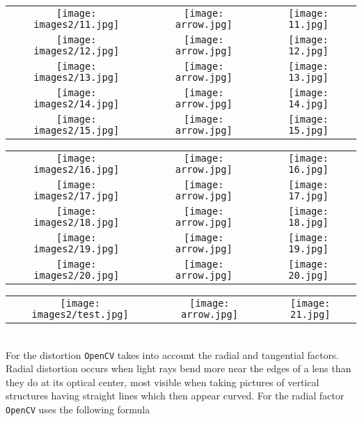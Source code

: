 \documentclass[12pt, a4paper]{article}
\begin{document}
\begin{enumerate}
\hspace*{-1cm}
\begin{tabular}[t]{ccc}
\texttt{[image: images2/11.jpg]} & \texttt{[image: arrow.jpg]} &\texttt{[image: 11.jpg]} \\
\texttt{[image: images2/12.jpg]} & \texttt{[image: arrow.jpg]} &\texttt{[image: 12.jpg]} \\
\texttt{[image: images2/13.jpg]} & \texttt{[image: arrow.jpg]} &\texttt{[image: 13.jpg]} \\
\texttt{[image: images2/14.jpg]} & \texttt{[image: arrow.jpg]} &\texttt{[image: 14.jpg]} \\
\texttt{[image: images2/15.jpg]} & \texttt{[image: arrow.jpg]} &\texttt{[image: 15.jpg]} \\
\end{tabular}
\newpage
\hspace*{-1cm}
\begin{tabular}[t]{ccc}
\texttt{[image: images2/16.jpg]} & \texttt{[image: arrow.jpg]} &\texttt{[image: 16.jpg]} \\
\texttt{[image: images2/17.jpg]} & \texttt{[image: arrow.jpg]} &\texttt{[image: 17.jpg]} \\
\texttt{[image: images2/18.jpg]} & \texttt{[image: arrow.jpg]} &\texttt{[image: 18.jpg]} \\
\texttt{[image: images2/19.jpg]} & \texttt{[image: arrow.jpg]} &\texttt{[image: 19.jpg]} \\
\texttt{[image: images2/20.jpg]} & \texttt{[image: arrow.jpg]} &\texttt{[image: 20.jpg]} \\
\end{tabular}
\newpage
\hspace*{-1cm}
\begin{tabular}[t]{ccc}
\texttt{[image: images2/test.jpg]} & \texttt{[image: arrow.jpg]} &\texttt{[image: 21.jpg]} \\
\end{tabular}
\\
For the distortion \texttt{OpenCV} takes into account the radial and tangential factors. Radial distortion occurs when light rays bend more near the edges of a lens than they do at its optical center, most visible when taking pictures of vertical structures having straight lines which then appear curved. For the radial factor \texttt{OpenCV} uses the following formula \\

\end{enumerate}
\end{document}
